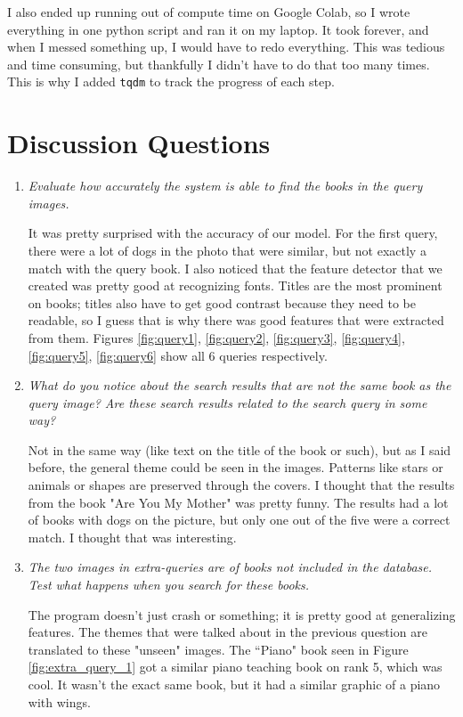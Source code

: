 \documentclass[11pt]{article}
\begin{document}
I also ended up running out of compute time on Google Colab, so I wrote everything in one python script and ran it on my laptop.
It took forever, and when I messed something up, I would have to redo everything.
This was tedious and time consuming, but thankfully I didn't have to do that too many times.
This is why I added \lstinline{tqdm} to track the progress of each step.

\section{Discussion Questions}

\begin{enumerate}

	\item \textit{Evaluate how accurately the system is able to find the books in the query images.}

		It was pretty surprised with the accuracy of our model.
		For the first query, there were a lot of dogs in the photo that were similar, but not exactly a match with the query book.
		I also noticed that the feature detector that we created was pretty good at recognizing fonts.
		Titles are the most prominent on books; titles also have to get good contrast because they need to be readable, so I guess that is why there was good features that were extracted from them.
		Figures \ref{fig:query1}, \ref{fig:query2}, \ref{fig:query3}, \ref{fig:query4}, \ref{fig:query5}, \ref{fig:query6} show all 6 queries respectively.

	\item \textit{What do you notice about the search results that are not the same book as the query image? Are these search results related to the search query in some way?}
	
		Not in the same way (like text on the title of the book or such), but as I said before, the general theme could be seen in the images.
		Patterns like stars or animals or shapes are preserved through the covers.
		I thought that the results from the book "Are You My Mother" was pretty funny.
		The results had a lot of books with dogs on the picture, but only one out of the five were a correct match.
		I thought that was interesting.

	\item \textit{The two images in extra-queries are of books not included in the database. Test what happens when you search for these books.}

		The program doesn't just crash or something; it is pretty good at generalizing features.
		The themes that were talked about in the previous question are translated to these "unseen" images.
		The ``Piano" book seen in Figure \ref{fig:extra_query_1} got a similar piano teaching book on rank 5, which was cool.
		It wasn't the exact same book, but it had a similar graphic of a piano with wings.


\end{enumerate}
\end{document}
